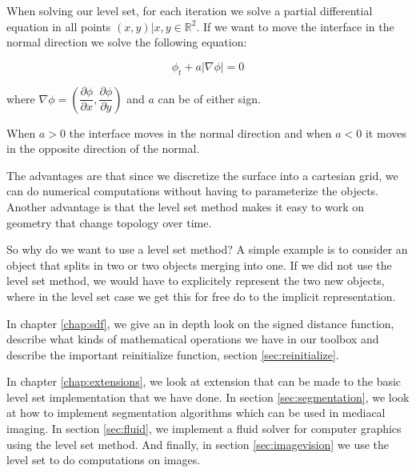 
When solving our level set, for each iteration we solve a partial differential equation in all points $(x,y) | x,y \in \mathbb{R}^{2}$. If we want to move the interface in the normal direction we solve the following equation:

\begin{equation}
\label{introduction:eq:levelsetndirection}
  \phi_{t} + a|\nabla \phi| = 0
\end{equation}

where $\nabla \phi = (\dfrac{\partial \phi}{\partial x}, \dfrac{\partial \phi}{\partial y})$  and $a$ can be of either sign. 

When $a > 0$ the interface moves in the normal direction and when $a < 0$ it moves in the opposite direction of the normal.

The advantages are that since we discretize the surface into a cartesian grid, we can do numerical computations without having to parameterize the objects. Another advantage is that the level set method makes it easy to work on geometry that change topology over time.


So why do we want to use a level set method? A simple example is to consider an object that splits in two or two objects merging into one. If we did not use the level set method, we would have to explicitely represent the two new objects, where in the level set case we get this for free do to the implicit representation.



In chapter \vref{chap:sdf}, we give an in depth look on the signed distance function, describe what kinds of mathematical operations we have in our toolbox and describe the important reinitialize function, section \vref{sec:reinitialize}.

In chapter \vref{chap:extensions}, we look at extension that can be made to the basic level set implementation that we have done. In section \vref{sec:segmentation}, we look at how to implement segmentation algorithms which can be used in mediacal imaging. In section \vref{sec:fluid}, we implement a fluid solver for computer graphics using the level set method. And finally, in section \vref{sec:imagevision} we use the level set to do computations on images.





